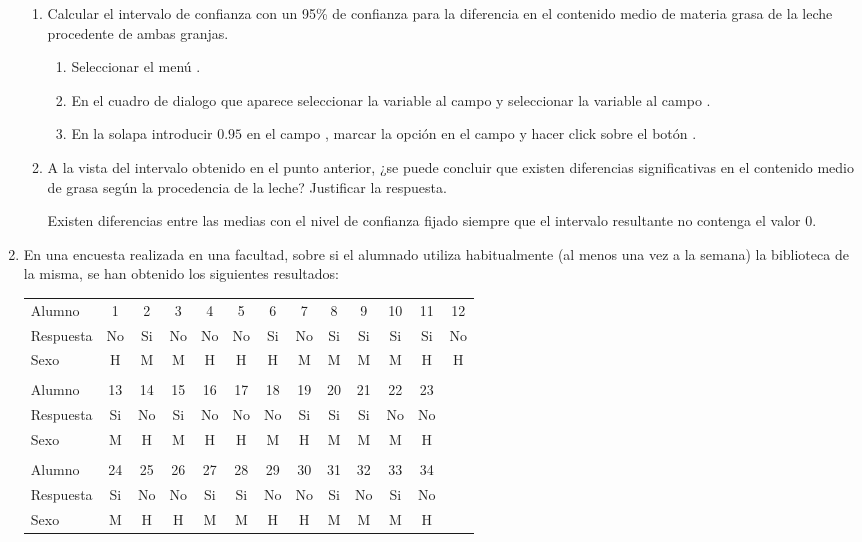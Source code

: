 \begin{enumerate}[leftmargin=*]
\begin{enumerate}
\item Calcular el intervalo de confianza con un 95\% de confianza para la diferencia en el contenido medio de materia
grasa de la leche procedente de ambas granjas. 
\begin{indicacion}
\begin{enumerate}
\item Seleccionar el menú .
\item En el cuadro de dialogo que aparece seleccionar la variable  al campo  y seleccionar la
variable  al campo .
\item En la solapa  introducir $0.95$ en el campo , marcar la opción  en el campo  y hacer click sobre el botón .
\end{enumerate}
\end{indicacion}

\item A la vista del intervalo obtenido en el punto anterior, ¿se puede concluir que existen diferencias
significativas en el contenido medio de grasa según la procedencia de la leche? Justificar la respuesta.
\begin{indicacion}
Existen diferencias entre las medias con el nivel de confianza fijado siempre que el intervalo resultante no contenga el valor 0.
\end{indicacion}
\end{enumerate}


\item En una encuesta realizada en una facultad, sobre si el alumnado utiliza habitualmente (al menos una vez a la
semana) la biblioteca de la misma, se han obtenido los siguientes resultados:
\begin{center}
\begin{tabular}{lcccccccccccc}
\hline
Alumno & 1 & 2 & 3 & 4 & 5 & 6 & 7 & 8 & 9 & 10 & 11 & 12  \\
Respuesta & No & Si & No & No & No & Si & No & Si & Si & Si & Si & No \\
Sexo & H & M & M & H & H & H & M & M & M & M & H & H \\
\hline\\

\hline
Alumno    & 13 & 14 & 15 & 16 & 17 & 18 & 19 & 20 & 21 & 22 & 23 \\
Respuesta & Si  & No  & Si  & No  & No  & No  & Si  & Si  & Si  & No  & No  \\
Sexo & M & H & M & H & H & M & H & M & M & M & H \\
\hline\\
\hline
Alumno 	  & 24 & 25 & 26 & 27 & 28 & 29 & 30 & 31 & 32 & 33 & 34 \\
Respuesta & Si & No & No & Si & Si & No & No & Si & No & Si & No \\
Sexo & M & H & H & M & M & H & H & M & M & M & H\\
\hline
\end{tabular}
\end{center}


\end{enumerate}
